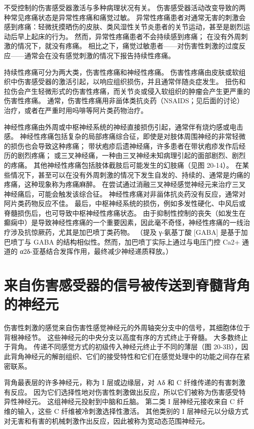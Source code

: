 不受控制的伤害感受器激活与多种病理状况有关。 伤害感受器活动改变导致的两种常见疼痛状态是异常性疼痛和痛觉过敏。 异常性疼痛患者对通常无害的刺激会感到疼痛：轻微抚摸晒伤的皮肤、类风湿性关节炎患者的关节运动，甚至是剧烈运动后早上起床的行为。 然而，异常性疼痛患者不会持续感到疼痛； 在没有外周刺激的情况下，就没有疼痛。 相比之下，痛觉过敏患者——对伤害性刺激的过度反应——通常会在没有感觉刺激的情况下报告持续性疼痛。

持续性疼痛可分为两大类，伤害性疼痛和神经性疼痛。 伤害性疼痛由皮肤或软组织中伤害感受器的激活引起，以响应组织损伤，并且通常伴随炎症发生。 扭伤和拉伤会产生轻微形式的伤害性疼痛，而关节炎或侵入软组织的肿瘤会产生更严重的伤害性疼痛。 通常，伤害性疼痛用非甾体类抗炎药（NSAIDS；见后面的讨论）治疗，或者在严重时用吗啡等阿片类药物治疗。

神经性疼痛由外周或中枢神经系统的神经直接损伤引起，通常伴有烧灼感或电击感。 神经性疼痛包括复杂的局部疼痛综合征，即使是对肢体周围神经的非常轻微的损伤也会导致这种疼痛； 带状疱疹后遗神经痛，许多患者在带状疱疹发作后经历的剧烈疼痛； 或三叉神经痛，一种由三叉神经未知病理引起的面部剧烈、剧烈的疼痛。 其他神经性疼痛包括肢体截肢后可能发生的幻肢痛（见图 20-14）。 在某些情况下，甚至可以在没有外周刺激的情况下发生自发的、持续的、通常是灼痛的疼痛，这种现象称为疼痛麻醉。 在尝试通过消融三叉神经感觉神经元来治疗三叉神经痛后，可能会触发该综合征。 神经性疼痛对非甾体抗炎药没有反应，通常对阿片类药物反应不佳。 最后，中枢神经系统的损伤，例如多发性硬化、中风后或脊髓损伤后，也可导致中枢神经性疼痛状态。 由于抑制性控制的丧失（如发生在癫痫中）是导致神经性疼痛的一个重要因素，因此毫不奇怪，神经性疼痛的一线治疗涉及抗惊厥药，尤其是加巴喷丁类药物。 （提及 γ-氨基丁酸 [GABA] 是基于加巴喷丁与 GABA 的结构相似性。然而，加巴喷丁实际上通过与电压门控 Ca2+ 通道的 α2δ-亚基结合发挥作用，最终减少神经递质释放。）


\section{来自伤害感受器的信号被传送到脊髓背角的神经元}
伤害性刺激的感觉来自伤害性感觉神经元的外周轴突分支中的信号，其细胞体位于背根神经节。 这些神经元的中央分支以高度有序的方式终止于脊髓。 大多数终止于背角。 传递不同感觉方式的初级传入神经元终止于不同的薄层（图 20-3B），因此背角神经元的解剖组织、它们的接受特性和它们在感觉处理中的功能之间存在紧密联系。

背角最表层的许多神经元，称为 I 层或边缘层，对 Aδ 和 C 纤维传递的有害刺激有反应。 因为它们选择性地对伤害性刺激做出反应，所以它们被称为伤害感受特异性神经元。 这组神经元投射到中脑和丘脑。 第二类 I 层神经元接收来自 C 纤维的输入，这些 C 纤维被冷刺激选择性激活。 其他类别的 I 层神经元以分级方式对无害和有害的机械刺激作出反应，因此被称为宽动态范围神经元。

